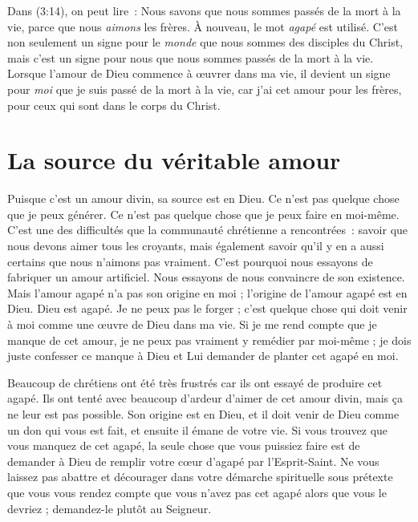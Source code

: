 Dans (3:14), on peut lire~:
 \og Nous savons que nous sommes passés de la mort à la vie,
 parce que nous \emph{aimons} les frères. \fg{}
 À nouveau, le mot \emph{agapé} est utilisé.
 C'est non seulement un signe pour le \emph{monde}
 que nous sommes des disciples du Christ, mais c'est un signe pour nous
 que nous sommes passés de la mort à la vie.
 Lorsque l'amour de Dieu commence à \oe{}uvrer dans ma vie,
 il devient un signe pour \emph{moi} que je suis passé de la mort à la vie,
 car j'ai cet amour pour les frères, pour ceux qui sont
 dans le corps du Christ.


\section{La source du v\'eritable amour}

Puisque c'est un amour divin, sa source est en Dieu.
 Ce n'est pas quelque chose que je peux générer.
 Ce n'est pas quelque chose que je peux faire en moi-même.
 C'est une des difficultés que la communauté chrétienne a rencontrées~:
 savoir que nous devons aimer tous les croyants, mais également savoir
 qu'il y en a aussi certains que nous n'aimons pas vraiment.
 C'est pourquoi nous essayons de fabriquer un amour artificiel.
 Nous essayons de nous convaincre de son existence.
 Mais l'amour agapé n'a pas son origine en moi ;
 l'origine de l'amour agapé est en Dieu. Dieu est agapé.
 Je ne peux pas le forger ; c'est quelque chose qui doit venir à moi
 comme une œuvre de Dieu dans ma vie.
 Si je me rend compte que je manque de cet amour, je ne peux pas vraiment
 y remédier par moi-même ; je dois juste confesser ce manque à Dieu
 et Lui demander de planter cet agapé en moi.

Beaucoup de chrétiens ont été très frustrés car ils ont essayé
 de produire cet agapé.
 Ils ont tenté avec beaucoup d'ardeur d'aimer de cet amour divin,
 mais ça ne leur est pas possible. Son origine est en Dieu,
 et il doit venir de Dieu comme un don qui vous est fait,
 et ensuite il émane de votre vie. Si vous trouvez que vous manquez
 de cet agapé, la seule chose que vous puissiez faire est de demander à Dieu
 de remplir votre cœur d'agapé par l'Esprit-Saint.
 Ne vous laissez pas abattre et décourager
 dans votre démarche spirituelle
 sous prétexte que vous vous rendez compte que vous n'avez pas
 cet agapé alors que vous le devriez ;
 demandez-le plutôt au Seigneur.
\closechapter

